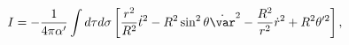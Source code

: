 \begin{equation}
I = - \frac{1}{4\pi\alpha'} \int d\tau d\sigma \left[
\frac{r^2}{R^2}\dot{t}^2 - R^2\sin^2\theta \dot{\var}^2 - 
\frac{R^2}{r^2}\dot{r}^2 + R^2\theta'^2 \right],
\end{equation}

